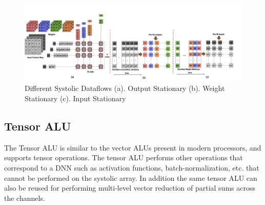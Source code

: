 \begin{figure}[h]
    \centering
    \includegraphics[scale=0.4]{images/Dataflow.png}
    \caption{Different Systolic Dataflows (a). Output Stationary (b). Weight Stationary (c). Input Stationary \cite{}}
    \label{fig:dataflows}
\end{figure}

\subsection{Tensor ALU}
The Tensor ALU is similar to the vector ALUs present in modern processors, and supports tensor operations. The tensor ALU performs other operations that correspond to a DNN such as activation functions, batch-normalization, etc. that cannot be performed on the systolic array. In addition the same tensor ALU can also be reused for performing multi-level vector reduction of partial sums across the channels.

%
%
%

